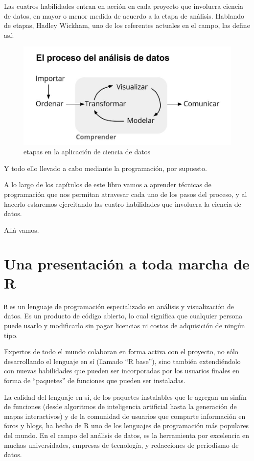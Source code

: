 \documentclass[]{book}
\begin{document}
Las cuatros habilidades entran en acción en cada proyecto que involucra
ciencia de datos, en mayor o menor medida de acuerdo a la etapa de
análisis. Hablando de etapas, Hadley Wickham, uno de los referentes
actuales en el campo, las define así:

\begin{figure}
\includegraphics[width=6.28in]{imagenes/proceso_ciencia_datos} \caption{etapas en la aplicación de ciencia de datos}\label{fig:unnamed-chunk-3}
\end{figure}

Y todo ello llevado a cabo mediante la programación, por supuesto.

A lo largo de los capítulos de este libro vamos a aprender técnicas de
programación que nos permitan atravesar cada uno de los pasos del
proceso, y al hacerlo estaremos ejercitando las cuatro habilidades que
involucra la ciencia de datos.

Allá vamos.

\chapter{Una presentación a toda marcha de
R}\label{una-presentacion-a-toda-marcha-de-r}

\texttt{R} es un lenguaje de programación especializado en análisis y
visualización de datos. Es un producto de código abierto, lo cual
significa que cualquier persona puede usarlo y modificarlo sin pagar
licencias ni costos de adquisición de ningún tipo.

Expertos de todo el mundo colaboran en forma activa con el proyecto, no
sólo desarrollando el lenguaje en sí (llamado ``R base''), sino también
extendiéndolo con nuevas habilidades que pueden ser incorporadas por los
usuarios finales en forma de ``paquetes'' de funciones que pueden ser
instaladas.

La calidad del lenguaje en sí, de los paquetes instalables que le
agregan un sinfín de funciones (desde algoritmos de inteligencia
artificial hasta la generación de mapas interactivos) y de la comunidad
de usuarios que comparte información en foros y blogs, ha hecho de R uno
de los lenguajes de programación más populares del mundo. En el campo
del análisis de datos, es la herramienta por excelencia en muchas
universidades, empresas de tecnología, y redacciones de periodismo de
datos.
\end{document}
